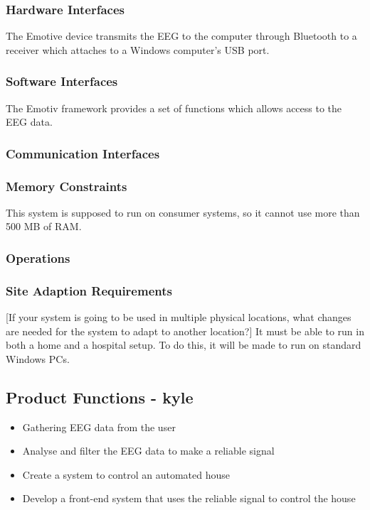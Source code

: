 \documentclass{article}
\begin{document}
\subsubsection{Hardware Interfaces}

The Emotive device transmits the EEG to the computer through Bluetooth to a receiver which attaches to a Windows computer's USB port.

\subsubsection{Software Interfaces}

The Emotiv framework provides a set of functions which allows access 	to the EEG data.

\subsubsection{Communication Interfaces}

\subsubsection{Memory Constraints}

This system is supposed to run on consumer systems, so it cannot use more than 500 MB of RAM.

\subsubsection{Operations}

\subsubsection{Site Adaption Requirements}

[If your system is going to be used in multiple physical locations, what changes are needed for the system to adapt to another location?]
It must be able to run in both a home and a hospital setup. To do this, it will be made to run on standard Windows PCs.

\subsection{Product Functions - kyle}
\begin{itemize}
\item Gathering EEG data from the user
\item Analyse and filter the EEG data to make a reliable signal
\item Create a system to control an automated house
\item Develop a front-end system that uses the reliable signal to control the house

\end{itemize}
\end{document}
